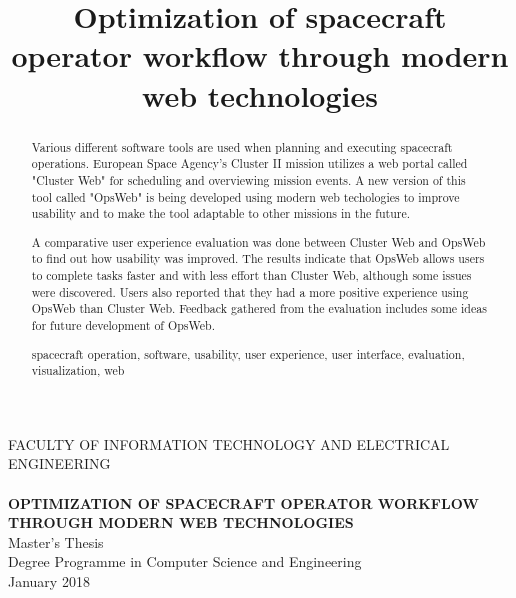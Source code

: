 \documentclass[a4paper, 12pt,titlepage]{dithesis}
\title{Optimization of spacecraft operator workflow through modern web technologies}
\begin{document}
\begin{titlepage}
	{\sffamily\fontsize{9}{1pt}\selectfont FACULTY OF INFORMATION TECHNOLOGY AND ELECTRICAL ENGINEERING\\}
	\vspace{65 mm}
	{\textbf{\fontsize{16}{19pt}\selectfont \getfirstname\ \getlastname }\\}
	\vspace{15 mm}
	{\textbf{\fontsize{18}{22pt}\selectfont OPTIMIZATION OF SPACECRAFT OPERATOR WORKFLOW THROUGH MODERN WEB TECHNOLOGIES\\}}
	\vspace{53 mm}
	{\fontsize{14}{17}\selectfont Master's Thesis \\Degree Programme in Computer Science and Engineering \\ January 2018\\}
\end{titlepage}


\begin{abstract}
Various different software tools are used when planning and executing spacecraft operations. European Space Agency's Cluster II mission utilizes a web portal called "Cluster Web" for scheduling and overviewing mission events. A new version of this tool called "OpsWeb" is being developed using modern web techologies to improve usability and to make the tool adaptable to other missions in the future. 

A comparative user experience evaluation was done between Cluster Web and OpsWeb to find out how usability was improved. The results indicate that OpsWeb allows users to complete tasks faster and with less effort than Cluster Web, although some issues were discovered. Users also reported that they had a more positive experience using OpsWeb than Cluster Web. Feedback gathered from the evaluation includes some ideas for future development of OpsWeb.

\keywords spacecraft operation, software, usability, user experience, user interface, evaluation, visualization, web

\end{abstract}
\end{document}
